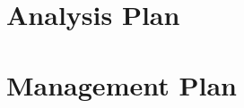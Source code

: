 \documentclass[12pt]{article}
\begin{document}
\newpage
\section*{Analysis Plan} %


\newpage
\section*{Management Plan} %


\newpage


\end{document}
